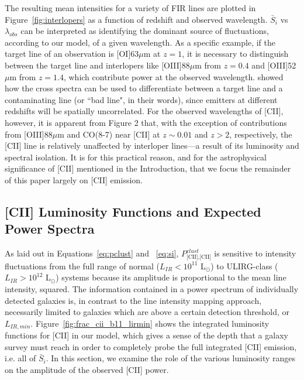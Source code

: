 \documentclass[iop,twocolappendix]{emulateapj}
\begin{document}
The resulting mean intensities for a variety of FIR lines are plotted in Figure~\ref{fig:interlopers} as a function of redshift and observed wavelength. $\bar{S}_{i}$ vs $\lambda_{obs}$ can be interpreted as identifying the dominant source of fluctuations, according to our model, of a given wavelength. As a specific example, if the target line of an observation is [OI]63$\mu$m at $z = 1$, it is necessary to distinguish between the target line and interlopers like [OIII]88$\mu$m from $z=0.4$ and [OIII]52$\mu$m from $z=1.4$, which contribute power at the observed wavelength. \citet{visbal10} showed how the cross spectra can be used to differentiate between a target line and a contaminating line (or ``bad line", in their words), since emitters at different redshifts will be spatially uncorrelated. For the observed wavelengths of [CII], however, it is apparent from Figure 2 that, with the exception of contributions from [OIII]88$\mu$m and CO(8-7) near [CII] at $z \sim 0.01$ and $z>2$, respectively, the [CII] line is relatively unaffected by interloper lines---a result of its luminosity and spectral isolation. It is for this practical reason, and for the astrophysical significance of [CII] mentioned in the Introduction, that we focus the remainder of this paper largely on [CII] emission.

\subsection{[CII] Luminosity Functions and Expected Power Spectra}

As laid out in Equations~\ref{eq:pclust} and ~\ref{eq:si}, $P_{\textrm{[CII],[CII]}}^{clust}$ is sensitive to intensity fluctuations from the full range of normal ($L_{IR} < 10^{11}$ L$_{\odot}$) to ULIRG-class ($L_{IR} > 10^{12}$ L$_{\odot}$) systems because its amplitude is proportional to the mean line intensity, squared. The information contained in a power spectrum of individually detected galaxies is, in contrast to the line intensity mapping approach, necessarily limited to galaxies which are above a certain detection threshold, or $L_{IR,min}$. Figure~\ref{fig:frac_cii_b11_lirmin} shows the integrated luminosity functions for [CII] in our model, which gives a sense of the depth that a galaxy survey must reach in order to completely probe the full integrated [CII] emission, i.e. all of $\bar{S}_i$. In this section, we examine the role of the various luminosity ranges on the amplitude of the observed [CII] power.  
\end{document}
